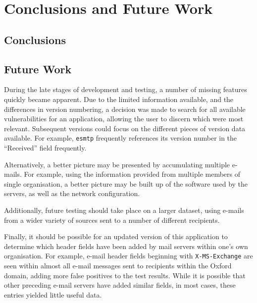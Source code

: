 \chapter{Conclusions and Future Work}\label{chap:conc}
\section{Conclusions}

\section{Future Work}

During the late stages of development and testing, a number of missing features
quickly became apparent. Due to the limited information available, and the
differences in version numbering, a decision was made to search for all
available vulnerabilities for an application, allowing the user to discern
which were most relevant.  Subsequent versions could focus on the different
pieces of version data available.  For example, \texttt{esmtp} frequently
references its version number in the ``Received'' field frequently.

Alternatively, a better picture may be presented by accumulating multiple
e-mails. For example, using the information provided from multiple members of
single organisation, a better picture may be built up of the software used by
the servers, as well as the network configuration.

Additionally, future testing should take place on a larger dataset, using
e-mails from a wider variety of sources sent to a number of different
recipients.  

Finally, it should be possible for an updated version of this application to
determine which header fields have been added by mail servers within one's own
organisation.  For example, e-mail header fields beginning with
\texttt{X-MS-Exchange} are seen within almost all e-mail messages sent to
recipients within the Oxford domain, adding more false positives to the test
results. While it is possible that other preceding e-mail servers have added
similar fields, in most cases, these entries yielded little useful data.

